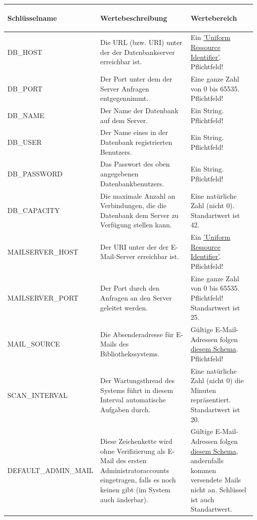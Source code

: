 \documentclass{article}
\begin{document}
\begin{center}
\begin{table}[H]
\begin{tabular} {| m{4cm} | m{6cm} | m{5cm} |}
\hline
\hypertarget{configTabelle}{Schlüsselname} & Wertebeschreibung & Wertebereich \\
\hline
DB\_HOST & Die URL (bzw. URI) unter der der Datenbankserver erreichbar ist.& Ein \hyperlink{https://datatracker.ietf.org/doc/html/rfc3986}{'Uniform Ressource Identifier'}. Pflichtfeld!\\
\hline
DB\_PORT & Der Port unter dem der Server Anfragen entgegennimmt. & Eine ganze Zahl von 0 bis 65535. Pflichtfeld!\\
\hline
DB\_NAME & Der Name der Datenbank auf dem Server. & Ein String. Pflichtfeld!\\
\hline
DB\_USER & Der Name eines in der Datenbank registrierten Benutzers. & Ein String. Pflichtfeld!\\
\hline
DB\_PASSWORD & Das Passwort des oben angegebenen Datenbankbenutzers. & Ein String. Pflichtfeld!\\
\hline
DB\_CAPACITY & Die maximale Anzahl an Verbindungen, die die Datenbank dem Server zu Verfügung stellen kann. & Eine natürliche Zahl (nicht 0). Standartwert ist 42.\\
\hline
MAILSERVER\_HOST & Der URI unter der der E-Mail-Server erreichbar ist. &  Ein \hyperlink{https://datatracker.ietf.org/doc/html/rfc3986}{'Uniform Ressource Identifier'}. Pflichtfeld! \\ 
\hline
MAILSERVER\_PORT & Der Port durch den Anfragen an den Server geleitet werden. & Eine ganze Zahl von 0 bis 65535. Pflichtfeld! Standartwert ist 25. \\
\hline
MAIL\_SOURCE & Die Absenderadresse für E-Mails des Bibliothekssystems. & Gültige E-Mail-Adressen folgen \hyperlink{https://datatracker.ietf.org/doc/html/rfc5322}{diesem Schema}. Pflichtfeld!\\
\hline
SCAN\_INTERVAL & Der Wartungsthread des Systems führt in diesem Interval automatische Aufgaben durch. & Eine natürliche Zahl (nicht 0) die Minuten repräsentiert. Standartwert ist 20. \\
\hline
DEFAULT\_ADMIN\_MAIL & Diese Zeichenkette wird ohne Verifizierung als E-Mail des ersten Administratoraccounts eingetragen, falls es noch keinen gibt (im System auch änderbar).  & Gültige E-Mail-Adressen folgen \hyperlink{https://datatracker.ietf.org/doc/html/rfc5322}{diesem Schema}, andernfalls kommen versendete Mails nicht an. Schlüssel ist auch Standartwert.\\

\end{tabular}
\end{table}
\end{center}
\end{document}
